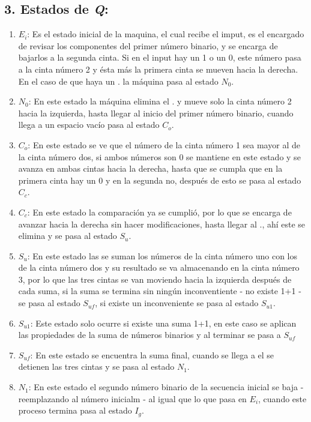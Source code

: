\documentclass[12pt]{article}
\begin{document}
\subsection*{3. Estados de \textit{Q}:}
\begin{enumerate}
		        \item \textit{$E_{i}$}: Es el estado inicial de la maquina, el cual recibe el imput, es el encargado de revisar los componentes del primer número binario, y se encarga de bajarlos a la segunda cinta. Si en el input hay un 1 o un 0, este número pasa a la cinta número 2 y ésta más la primera cinta se mueven hacia la derecha. En el caso de que haya un . la máquina pasa al estado \textit{$N_{0}$}.
		        \item \textit{$N_{0}$}: En este estado la máquina elimina el . y mueve solo la cinta número 2 hacia la izquierda, hasta llegar al inicio del primer número binario, cuando llega a un espacio vacío pasa al estado \textit{$C_{o}$}.
		        \item \textit{$C_{o}$}: En este estado se ve que el número de la cinta número 1 sea mayor al de la cinta número dos, si ambos números son 0 se mantiene en este estado y se avanza en ambas cintas hacia la derecha, hasta que se cumpla que en la primera cinta hay un 0 y en la segunda no, después de esto se pasa al estado \textit{$C_{c}$}.
		        \item \textit{$C_{c}$}: En este estado la comparación ya se cumplió, por lo que se encarga de avanzar hacia la derecha sin hacer modificaciones, hasta llegar al ., ahí este se elimina y se pasa al estado \textit{$S_{u}$}.
		        \item \textit{$S_{u}$}: En este estado las se suman los números de la cinta número uno con los de la cinta número dos y su resultado se va almacenando en la cinta número 3, por lo que las tres cintas se van moviendo hacia la izquierda después de cada suma, si la suma se termina sin ningún inconventiente - no existe 1+1 - se pasa al estado \textit{$S_{uf}$}, si existe un inconveniente se pasa al estado \textit{$S_{u1}$}.
		        \item \textit{$S_{u1}$}: Este estado solo ocurre si existe una suma 1+1, en este caso se aplican las propiedades de la suma de números binarios y al terminar se pasa a \textit{$S_{uf}$}
		        \item \textit{$S_{uf}$}: En este estado se encuentra la suma final, cuando se llega a el se detienen las tres cintas y se pasa al estado \textit{$N_{1}$}.
		        \item \textit{$N_{1}$}: En este estado el segundo número binario de la secuencia inicial se baja - reemplazando al número inicialm - al igual que lo que pasa en \textit{$E_{i}$}, cuando este proceso termina pasa al estado \textit{$I_{g}$}.

\end{enumerate}
\end{document}
